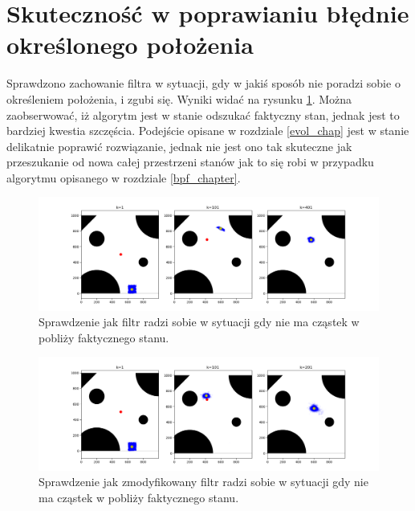 \section{Skuteczność w poprawianiu błędnie określonego położenia}
Sprawdzono zachowanie filtra w sytuacji, gdy w jakiś sposób nie poradzi sobie o określeniem położenia, i zgubi się. Wyniki widać na rysunku \ref{lost}. Można zaobserwować, iż algorytm jest w stanie odszukać faktyczny stan, jednak jest to bardziej kwestia szczęścia. Podejście opisane w rozdziale \ref{evol_chap} jest w stanie delikatnie poprawić rozwiązanie, jednak nie jest ono tak skuteczne jak przeszukanie od nowa całej przestrzeni stanów jak to się robi w przypadku algorytmu opisanego w rozdziale \ref{bpf_chapter}.
\begin{figure}[H]
	\begin{center}
		\includegraphics[width=15cm]{./lost.png}
		\caption{Sprawdzenie jak filtr radzi sobie w sytuacji gdy nie ma cząstek w pobliży faktycznego stanu.}
		\label{lost}
	\end{center}
\end{figure}
\begin{figure}[H]
	\begin{center}
		\includegraphics[width=15cm]{./lost_evol.png}
		\caption{Sprawdzenie jak zmodyfikowany filtr radzi sobie w sytuacji gdy nie ma cząstek w pobliży faktycznego stanu.}
		\label{lost_evol}
	\end{center}
\end{figure}
